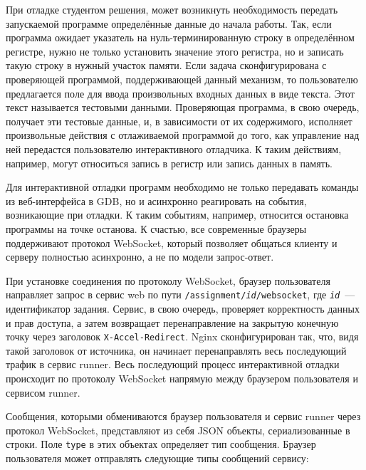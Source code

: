 \documentclass[a4paper,article,14pt]{extarticle}
\begin{document}
При отладке студентом решения, может возникнуть необходимость передать запускаемой программе определённые данные до начала работы. Так, если программа ожидает указатель на нуль-терминированную строку в определённом регистре, нужно не только установить значение этого регистра, но и записать такую строку в нужный участок памяти. Если задача сконфигурирована с проверяющей программой, поддерживающей данный механизм, то пользователю предлагается поле для ввода произвольных входных данных в виде текста. Этот текст называется тестовыми данными. Проверяющая программа, в свою очередь, получает эти тестовые данные, и, в зависимости от их содержимого, исполняет произвольные действия с отлаживаемой программой до того, как управление над ней передастся пользователю интерактивного отладчика. К таким действиям, например, могут относиться запись в регистр или запись данных в память.

Для интерактивной отладки программ необходимо не только передавать команды из веб-интерфейса в GDB, но и асинхронно реагировать на события, возникающие при отладки. К таким событиям, например, относится остановка программы на точке останова. К счастью, все современные браузеры поддерживают протокол WebSocket\cite{websocketcompat}, который позволяет общаться клиенту и серверу полностью асинхронно, а не по модели запрос-ответ.

При установке соединения по протоколу WebSocket, браузер пользователя направляет запрос в сервис web по пути \texttt{/assignment/\textit{id}/websocket}, где \texttt{\textit{id}}~--- идентификатор задания. Сервис, в свою очередь, проверяет корректность данных и прав доступа, а затем возвращает перенаправление на закрытую конечную точку через заголовок \texttt{X-Accel-Redirect}. Nginx сконфигурирован так, что, видя такой заголовок от источника, он начинает перенаправлять весь последующий трафик в сервис runner. Весь последующий процесс интерактивной отладки происходит по протоколу WebSocket напрямую между браузером пользователя и сервисом runner.

Сообщения, которыми обмениваются браузер пользователя и сервис runner через протокол WebSocket, представляют из себя JSON объекты, сериализованные в строки. Поле \texttt{type} в этих объектах определяет тип сообщения. Браузер пользователя может отправлять следующие типы сообщений сервису:
\end{document}
